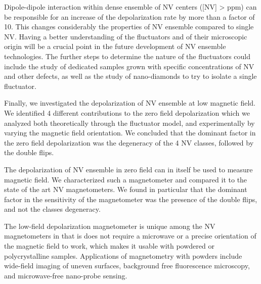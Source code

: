 \documentclass[a4paper,11pt]{report}
\begin{document}
Dipole-dipole interaction within dense ensemble of NV centers ([NV] > ppm) can be responsible for an increase of the depolarization rate by more than a factor of 10. This changes considerably the properties of NV ensemble compared to single NV. Having a better understanding of the fluctuators and of their microscopic origin will be a crucial point in the future development of NV ensemble technologies. The further steps to determine the nature of the fluctuators could include the study of dedicated samples grown with specific concentrations of NV and other defects, as well as the study of nano-diamonds to try to isolate a single fluctuator.

Finally, we investigated the depolarization of NV ensemble at low magnetic field. We identified 4 different contributions to the zero field depolarization which we analyzed both theoretically through the fluctuator model, and experimentally by varying the magnetic field orientation. We concluded that the dominant factor in the zero field depolarization was the degeneracy of the 4 NV classes, followed by the double flips. 

The depolarization of NV ensemble in zero field can in itself be used to measure magnetic field. We characterized such a magnetometer and compared it to the state of the art NV magnetometers. We found in particular that the dominant factor in the sensitivity of the magnetometer was the presence of the double flips, and not the classes degeneracy. 

The low-field depolarization magnetometer is unique among the NV magnetometers in that is does not require a microwave or a precise orientation of the magnetic field to work, which makes it usable with powdered or polycrystalline samples. Applications of magnetometry with powders include wide-field imaging of uneven surfaces, background free fluorescence microscopy, and microwave-free nano-probe sensing.

\printbibliography
\end{document}
